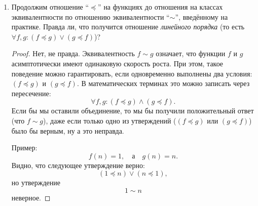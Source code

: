 \begin{enumerate}
\begin{enumerate}
\begin{proof}
        Так как $C$ всегда можно найти, то определение без конкретного $N$ оказывается эквивалентным исходному.
      \end{proof}
      \item Тот же вопрос про $o$.
      
      \begin{equation}
        f(n) = o(g(n)), \quad \text{если } \quad \exists C > 0, N \in \N: \forall n \geq N \quad f(n) < C \cdot g(n)
      \end{equation}
      В случае с o, функция $f$ трактуется как бесконечно малая по отношению к функции $g$:
      \begin{equation}
        \lim\limits_{n \to \infty} \frac{f(n)}{g(n)} = 0,
      \end{equation}
      то есть на бесконечности функция $g$ строго превосходит функцию $f$.
      В данном случае неравенства будут строгими, но, делая те же самые рассуждения, которые были сделаны в пункте (a), можно понять, что $C$ тоже всегда удастся подобрать.
      
      Определения будут эквивалентными.
    \end{enumerate}

  \item
    Продолжим отношение ``$\preceq$'' на функциях до отношения на классах эквивалентности по отношению эквивалентности ``$\sim$'', введённому на практике. Правда ли, что получится отношение \textit{линейного порядка} (то есть
    $\forall f, g: (f \preceq g) \lor (g \preceq f)$)?
    \begin{proof}
      Нет, не правда. Эквивалентность $f \sim g$ означает, что функции $f$ и $g$ асимптотически имеют одинаковую скорость роста. При этом, такое поведение можно гарантировать, если одновременно выполнены два условия: $(f \preceq g)$ и $(g \preceq f)$. В математических терминах это можно записать через пересечение:
      \begin{equation}
        \forall f, g: (f \preceq g) \land (g \preceq f).
      \end{equation}
      Если бы мы оставили объединение, то мы бы получили положительный ответ (что $f \sim g$), даже если только одно из утверждений ($(f \preceq g)$ или $(g \preceq f)$) было бы верным, ну а это неправда.
      
      Пример:
      \begin{equation}
        f(n) = 1, \quad \text{а} \quad g(n) = n.
      \end{equation}
      Видно, что следующее утверждение верно:
      \begin{equation}
        (1 \preceq n) \lor (n \preceq 1),
      \end{equation}
      но утверждение
      \begin{equation}
        1 \sim n
      \end{equation}
      неверное.
    \end{proof}


\end{enumerate}

